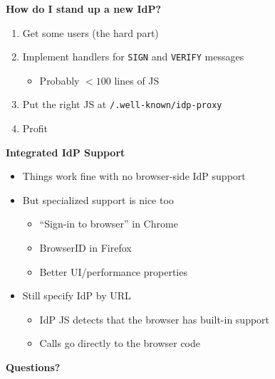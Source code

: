 \documentclass[helvetica]{seminar}
\newcommand{\heading}[1]{%
  \begin{center} 
    \large\bf 
    #1 
  \end{center} 
  \vspace{.4 in}}
\begin{document}
\begin{slide}
\heading{How do I stand up a new IdP?}

\begin{enumerate}
\item Get some users (the hard part)
\item Implement handlers for \verb^SIGN^ and \verb^VERIFY^ messages
  \begin{itemize}
  \item Probably $<100$ lines of JS
  \end{itemize}

\item Put the right JS at \verb^/.well-known/idp-proxy^
\item Profit
\end{enumerate}
\end{slide}


\begin{slide}
\heading{Integrated IdP Support}

\begin{itemize}
\item Things work fine with no browser-side IdP support
\item But specialized support is nice too
  \begin{itemize}
  \item ``Sign-in to browser'' in Chrome
  \item BrowserID in Firefox
  \item Better UI/performance properties
  \end{itemize}

\item Still specify IdP by URL
  \begin{itemize}
  \item IdP JS detects that the browser has built-in support
  \item Calls go directly to the browser code
  \end{itemize}
\end{itemize}

\end{slide}



\begin{slide}
\heading{Questions?}

\end{slide}
\end{document}
